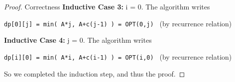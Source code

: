 \documentclass[openany]{article}
\begin{document}
\begin{proof}{Correctness}
    \textbf{Inductive Case 3:} i = 0. The algorithm writes 
    \begin{center}
        \texttt{dp[0][j] = min( A*j, A+c(j-1) ) = OPT(0,j) } (by recurrence relation)
    \end{center}
    
     \textbf{Inductive Case 4:} j = 0. The algorithm writes 
    \begin{center}
        \texttt{dp[i][0] = min( A*i, A+c(i-1) ) = OPT(i,0) } (by recurrence relation)
    \end{center}
    
    So we completed the induction step, and thus the proof.
\end{proof}



\end{document}
